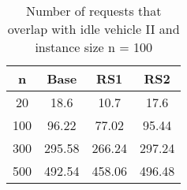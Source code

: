 \begin{table}[H]
\centering
\begin{tabular}{cccc}
  \hline
  \textbf{n} & \textbf{Base} & \textbf{RS1} & \textbf{RS2} \\\hline
  20 & 18.6 & 10.7 & 17.6 \\
  100 & 96.22 & 77.02 & 95.44 \\
  300 & 295.58 & 266.24 & 297.24 \\
  500 & 492.54 & 458.06 & 496.48 \\\hline
\end{tabular}
\caption{Number of requests that overlap with idle vehicle II and instance size n = 100}
\label{tab:wait:resrelocation-number-request-overlap-comparison_II_100}
\end{table}
